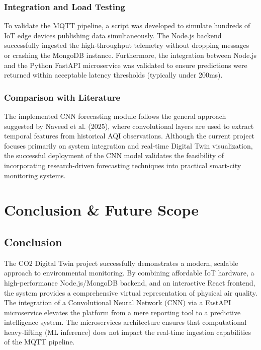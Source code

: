 \documentclass[a4paper, 12pt]{report}
\begin{document}
\subsection{Integration and Load Testing}
To validate the MQTT pipeline, a script was developed to simulate hundreds of IoT edge devices publishing data simultaneously. The Node.js backend successfully ingested the high-throughput telemetry without dropping messages or crashing the MongoDB instance. 
Furthermore, the integration between Node.js and the Python FastAPI microservice was validated to ensure predictions were returned within acceptable latency thresholds (typically under 200ms).

\subsection{Comparison with Literature}

The implemented CNN forecasting module follows the general approach
suggested by Naveed et al. (2025), where convolutional layers are used
to extract temporal features from historical AQI observations.
Although the current project focuses primarily on system integration and
real-time Digital Twin visualization, the successful deployment of the
CNN model validates the feasibility of incorporating research-driven
forecasting techniques into practical smart-city monitoring systems.
\chapter{Conclusion \& Future Scope}
\section{Conclusion}
The CO2 Digital Twin project successfully demonstrates a modern, scalable approach to environmental monitoring. By combining affordable IoT hardware, a high-performance Node.js/MongoDB backend, and an interactive React frontend, the system provides a comprehensive virtual representation of physical air quality.
The integration of a Convolutional Neural Network (CNN) via a FastAPI microservice elevates the platform from a mere reporting tool to a predictive intelligence system. The microservices architecture ensures that computational heavy-lifting (ML inference) does not impact the real-time ingestion capabilities of the MQTT pipeline. 
\end{document}

